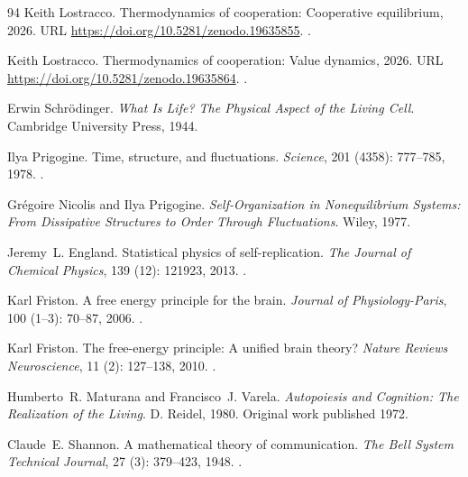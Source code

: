 \documentclass[11pt]{article}
\theoremstyle{plain}
\theoremstyle{definition}
\theoremstyle{remark}
\begin{document}
\begin{thebibliography}{94}
Keith Lostracco.
\newblock Thermodynamics of cooperation: Cooperative equilibrium,
  2026{}.
\newblock URL \url{https://doi.org/10.5281/zenodo.19635855}.
\newblock {}.

Keith Lostracco.
\newblock Thermodynamics of cooperation: Value dynamics, 2026{}.
\newblock URL \url{https://doi.org/10.5281/zenodo.19635864}.
\newblock {}.

Erwin Schr{\"o}dinger.
\newblock \emph{What Is Life? The Physical Aspect of the Living Cell}.
\newblock Cambridge University Press, 1944.

Ilya Prigogine.
\newblock Time, structure, and fluctuations.
\newblock \emph{Science}, 201 (4358): 777--785, 1978.
\newblock {}.

Gr{\'e}goire Nicolis and Ilya Prigogine.
\newblock \emph{Self-Organization in Nonequilibrium Systems: From Dissipative
  Structures to Order Through Fluctuations}.
\newblock Wiley, 1977.

Jeremy~L. England.
\newblock Statistical physics of self-replication.
\newblock \emph{The Journal of Chemical Physics}, 139 (12):
  121923, 2013.
\newblock {}.

Karl Friston.
\newblock A free energy principle for the brain.
\newblock \emph{Journal of Physiology-Paris}, 100 (1--3):
  70--87, 2006.
\newblock {}.

Karl Friston.
\newblock The free-energy principle: A unified brain theory?
\newblock \emph{Nature Reviews Neuroscience}, 11 (2):
  127--138, 2010.
\newblock {}.

Humberto~R. Maturana and Francisco~J. Varela.
\newblock \emph{Autopoiesis and Cognition: The Realization of the Living}.
\newblock D. Reidel, 1980.
\newblock Original work published 1972.

Claude~E. Shannon.
\newblock A mathematical theory of communication.
\newblock \emph{The Bell System Technical Journal}, 27 (3):
  379--423, 1948.
\newblock {}.


\end{thebibliography}
\end{document}
